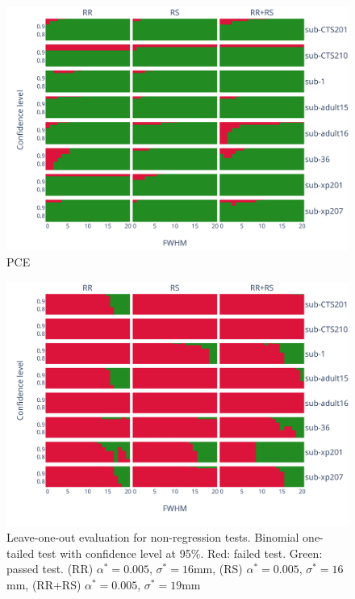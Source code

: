 \documentclass{article}
\begin{document}
\begin{figure}
    \centering
    \includegraphics[width=\linewidth]{figures/pce.pdf}
    \caption{PCE}
    \label{fig:my_label}
\end{figure}

\begin{figure}
    \centering
    \includegraphics[width=\linewidth]{figures/mct.pdf}
    \caption{Leave-one-out evaluation for non-regression tests. Binomial one-tailed test with confidence level at 95\%. Red: failed test. Green: passed test. (RR) $\alpha^*=0.005$, $\sigma^*=16$mm, (RS) $\alpha^*=0.005$, $\sigma^*=16$mm, (RR+RS) $\alpha^*=0.005$, $\sigma^*=19$mm}
    \label{fig:my_label}
\end{figure}
\end{document}

